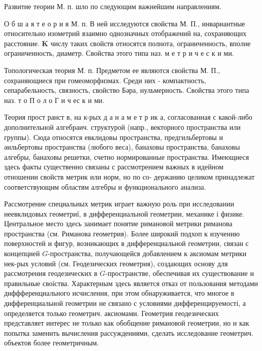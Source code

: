 \documentclass[10pt]{article}
\begin{document}
Развитие теории М. п. шло по следующим важнейшим направлениям.



О б ш а я т е о р и я М. п. В ней исследуются свойства М. П., инвариантные относительно изометрий взаимно однозначных отображений на, сохраняющих расстояние. $\mathbf{K}$ числу таких свойств относятся полнота, ограниченность, вполне ограниченность, диаметр. Свойства этого типа наз. м е т р и ч е с к и ми.



Топологическая теория М. п. Предметом ее являются свойства М. П., сохраняющиеся при гомеоморфизмах. Среди них - компактность, сепарабельность, связность, свойство Бәра, нульмерность. Свойства этого типа наз. т о П о л о Г и ч ес к и ми.



Теория прост ранст в, на к-рых д а н а м е т р ик а, согласованная с какой-либо дополнительной алгебраич. структурой (напр., векторного пространства или группы). Сюда относятся евклидовы пространства, предгильбертовы и әильбертовы пространства (любого веса), банаховы пространства, банаховы алгебры, банаховы решетки, счетно нормированные пространства. Имеющиеся здесь факты существенно связаны с рассмотрением важных в идейном отношении свойств метрик или норм, но по со- держанию целиком принадлежат соответствующим областям алгебры и функционального анализа.



Рассмотрение специальных метрик играет важную роль при исследовании неевклидовых геометриї, в дифференциальной геометрии, механике і физике. Центральное место здесь занимает понятие римановой метрики риманова пространства (см. Риманова геометрия). Более широкий подхоп к изучению поверхностей и фигур, возникающих в дифференциальной геометрии, связан с концепцией $G$-пространства, получающейся добавлением к аксиомам метрики нек-рых условий (см. Геодезических геометрия), создающих основу для рассмотрения геодезических в $G$-пространстве, обеспечивая их существование и правильные своїства. Характерным здесь является отказ от пользования методами диффференциального исчисления, при этом обнаруживается, что многое в дифференциальной геометрии не связано с условиями дифференцируемості, а определяется только геометрич. аксиомами. Геометрия геодезических представляет интерес не только как обобщение римановой геометрии, но и как попытка заменить вычисления рассуждениями, сделать исследование геометрич. объектов более геометричным.
\end{document}
